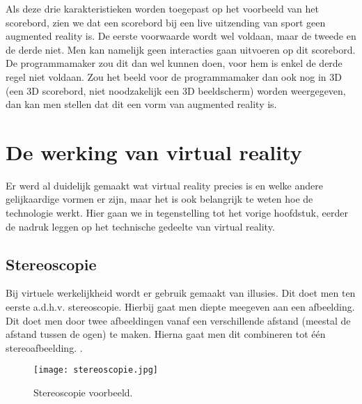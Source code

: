 Als deze drie karakteristieken worden toegepast op het voorbeeld van het scorebord, zien we dat een scorebord bij een live uitzending van sport geen augmented reality is. De eerste voorwaarde wordt wel voldaan, maar de tweede en de derde niet. Men kan namelijk geen interacties gaan uitvoeren op dit scorebord. De programmamaker zou dit dan wel kunnen doen, voor hem is enkel de derde regel niet voldaan. Zou het beeld voor de programmamaker dan ook nog in 3D (een 3D scorebord, niet noodzakelijk een 3D beeldscherm) worden weergegeven, dan kan men stellen dat dit een vorm van augmented reality is.

\section{De werking van virtual reality}
\label{sec:hoe-werkt-vr}
Er werd al duidelijk gemaakt wat virtual reality precies is en welke andere gelijkaardige vormen er zijn, maar het is ook belangrijk te weten hoe de technologie werkt. Hier gaan we in tegenstelling tot het vorige hoofdstuk, eerder de nadruk leggen op het technische gedeelte van virtual reality.

\subsection{Stereoscopie}
\label{subsec:stereoscopie}
Bij virtuele werkelijkheid wordt er gebruik gemaakt van illusies. Dit doet men ten eerste a.d.h.v. stereoscopie. Hierbij gaat men diepte meegeven aan een afbeelding. Dit doet men door twee afbeeldingen vanaf een verschillende afstand (meestal de afstand tussen de ogen) te maken. Hierna gaat men dit combineren tot één stereoafbeelding. \autocite{Rouse2011}.

\begin{figure}
	\centering
	\texttt{[image: stereoscopie.jpg]}
	\caption{Stereoscopie voorbeeld.}
	\label{fig:stereoscopie}
\end{figure}

